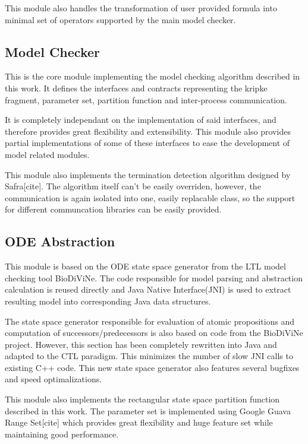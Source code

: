 \documentclass[12pt,oneside,draft]{fithesis2}
\begin{document}
				This module also handles the transformation of user provided formula into minimal set of operators supported by the main model checker.
				
			\subsection{Model Checker}
			
				This is the core module implementing the model checking algorithm described in this work. It defines the interfaces and contracts representing the kripke fragment, parameter set, partition function and inter-process communication.
				
				It is completely independant on the implementation of said interfaces, and therefore provides great flexibility and extensibility. This module also provides partial implementations of some of these interfaces to ease the development of model related modules. 
				
				This module also implements the termination detection algorithm designed by Safra[cite]. The algorithm itself can't be easily overriden, however, the communication is again isolated into one, easily replacable class, so the support for different communcation libraries can be easily provided.
	
			\subsection{ODE Abstraction}
			
				This module is based on the ODE state space generator from the LTL model checking tool BioDiViNe. The code responsible for model parsing and abstraction calculation is reused directly and Java Native Interface(JNI) is used to extract resulting model into corresponding Java data structures.
				
				The state space generator responsible for evaluation of atomic propositions and computation of successors/predecessors is also based on code from the BioDiViNe project. However, this section has been completely rewritten into Java and adapted to the CTL paradigm. This minimizes the number of slow JNI calls to existing C++ code. This new state space generator also features several bugfixes and speed optimalizations.
				
				This module also implements the rectangular state space partition function described in this work. The parameter set is implemented using Google Guava Range Set[cite] which provides great flexibility and huge feature set while maintaining good performance.
				
\end{document}
